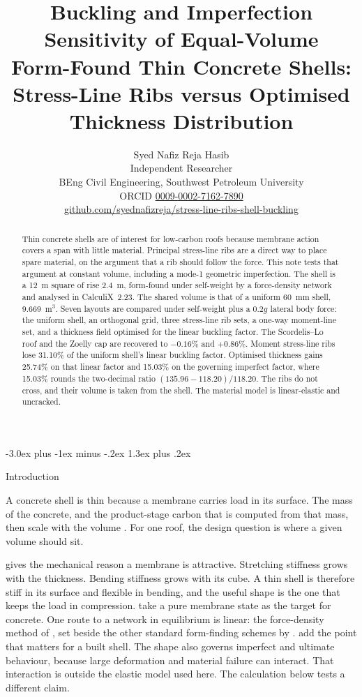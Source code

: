 \documentclass[11pt,a4paper]{article}
\title{Buckling and Imperfection Sensitivity of Equal-Volume\\
Form-Found Thin Concrete Shells:\\
Stress-Line Ribs versus Optimised Thickness Distribution}
\author{%
Syed Nafiz Reja Hasib\\[0.35em]
\normalsize Independent Researcher\\
BEng Civil Engineering, Southwest Petroleum University\\[0.25em]
ORCID \href{https://orcid.org/0009-0002-7162-7890}{0009-0002-7162-7890}\\
\href{https://github.com/syednafizreja/stress-line-ribs-shell-buckling}{github.com/syednafizreja/stress-line-ribs-shell-buckling}%
}
\date{}
\makeatletter
\renewcommand\section{\@startsection{section}{1}{\z@}%
  {-3.0ex plus -1ex minus -.2ex}%
  {1.3ex plus .2ex}%
  {\normalfont\Large\bfseries\raggedright}}
\makeatother
\begin{document}
\maketitle

\begin{abstract}
\noindent
Thin concrete shells are of interest for low-carbon roofs because membrane action covers a span with little material.
Principal stress-line ribs are a direct way to place spare material, on the argument that a rib should follow the force.
This note tests that argument at constant volume, including a mode-1 geometric imperfection.
The shell is a 12~m square of rise 2.4~m, form-found under self-weight by a force-density network and analysed in CalculiX~2.23.
The shared volume is that of a uniform 60~mm shell, 9.669~m\(^{3}\).
Seven layouts are compared under self-weight plus a \(0.2g\) lateral body force: the uniform shell, an orthogonal grid, three stress-line rib sets, a one-way moment-line set, and a thickness field optimised for the linear buckling factor.
The Scordelis--Lo roof and the Zoelly cap are recovered to \(-0.16\%\) and \(+0.86\%\).
Moment stress-line ribs lose 31.10\% of the uniform shell's linear buckling factor.
Optimised thickness gains 25.74\% on that linear factor and 15.03\% on the governing imperfect factor, where 15.03\% rounds the two-decimal ratio \((135.96-118.20)/118.20\).
The ribs do not cross, and their volume is taken from the shell.
The material model is linear-elastic and uncracked.
\end{abstract}

\section{Introduction}
\label{sec:intro}

A concrete shell is thin because a membrane carries load in its surface.
The mass of the concrete, and the product-stage carbon that is computed from that mass, then scale with the volume \citep{istructe2022}.
For one roof, the design question is where a given volume should sit.

\cite{calladine1983} gives the mechanical reason a membrane is attractive.
Stretching stiffness grows with the thickness.
Bending stiffness grows with its cube.
A thin shell is therefore stiff in its surface and flexible in bending, and the useful shape is the one that keeps the load in compression.
\cite{bletzinger1993} take a pure membrane state as the target for concrete.
One route to a network in equilibrium is linear: the force-density method of \cite{schek1974}, set beside the other standard form-finding schemes by \cite{veenendaal2012}.
\cite{ramm1991} add the point that matters for a built shell.
The shape also governs imperfect and ultimate behaviour, because large deformation and material failure can interact.
That interaction is outside the elastic model used here.
The calculation below tests a different claim.
\end{document}
